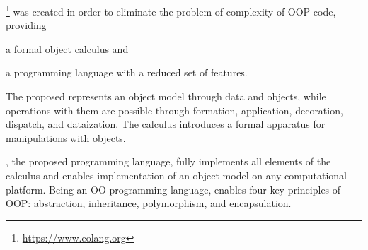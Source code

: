 
\eolang{}\footnote{\url{https://www.eolang.org}}
was created in order to eliminate the problem of complexity of
OOP code, providing
\begin{inparaenum}[1)]
  \item a formal object calculus and
  \item a programming language with a reduced set of features.
\end{inparaenum}
The proposed \phic{} represents an object model through
data and objects, while operations with them are possible
through formation, application, decoration, dispatch, and dataization. The calculus
introduces a formal apparatus for manipulations with objects.

\eolang{}, the proposed programming language, fully implements
all elements of the calculus and enables implementation of
an object model on any computational platform.
Being an OO programming language, \eolang{} enables four key principles of OOP:
abstraction, inheritance, polymorphism, and encapsulation.
